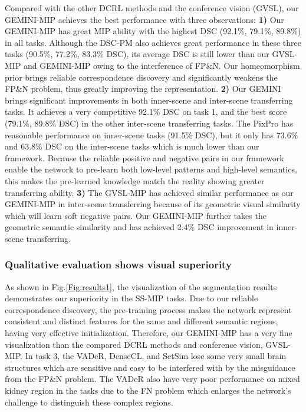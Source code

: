 Compared with the other DCRL methods and the conference vision (GVSL), our GEMINI-MIP achieves the best performance with three observations: \textbf{1)} Our GEMINI-MIP has great MIP ability with the highest DSC (92.1\%, 79.1\%, 89.8\%) in all tasks. Although the DSC-PM also achieves great performance in these three tasks (90.5\%, 77.2\%, 83.3\% DSC), its average DSC is still lower than our GVSL-MIP and GEMINI-MIP owing to the interference of FP\&N. Our homeomorphism prior brings reliable correspondence discovery and significantly weakens the FP\&N problem, thus greatly improving the representation. \textbf{2)} Our GEMINI brings significant improvements in both inner-scene and inter-scene transferring tasks. It achieves a very competitive 92.1\% DSC on task 1, and the best score (79.1\%, 89.8\% DSC) in the other inter-scene transferring tasks. The PixPro has reasonable performance on inner-scene tasks (91.5\% DSC), but it only has 73.6\% and 63.8\% DSC on the inter-scene tasks which is much lower than our framework. Because the reliable positive and negative pairs in our framework enable the network to pre-learn both low-level patterns and high-level semantics, this makes the pre-learned knowledge match the reality showing greater transferring ability. \textbf{3)} The GVSL-MIP has achieved similar performance as our GEMINI-MIP in inter-scene transferring because of its geometric visual similarity which will learn soft negative pairs. Our GEMINI-MIP further takes the geometric semantic similarity and has achieved 2.4\% DSC improvement in inner-scene transferring.

\subsubsection{Qualitative evaluation shows visual superiority}
As shown in Fig.\ref{Fig:results1}, the visualization of the segmentation results demonstrates our superiority in the SS-MIP tasks. Due to our reliable correspondence discovery, the pre-training process makes the network represent consistent and distinct features for the same and different semantic regions, having very effective initialization. Therefore, our GEMINI-MIP has a very fine visualization than the compared DCRL methods and conference vision, GVSL-MIP. In task 3, the VADeR, DenseCL, and SetSim lose some very small brain structures which are sensitive and easy to be interfered with by the misguidance from the FP\&N problem. The VADeR also have very poor performance on mixed kidney region in the tasks due to the FN problem which enlarges the network's challenge to distinguish these complex regions.
